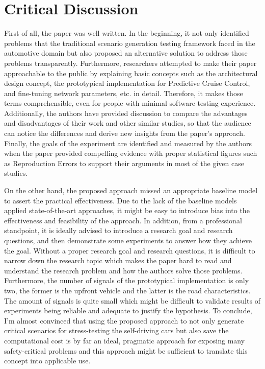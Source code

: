 \documentclass[10pt,a4paper]{report}
\begin{document}
\section{Critical Discussion}
First of all, the paper was well written. In the beginning, it not only identified problems that the traditional scenario generation testing framework faced in the automotive domain but also proposed an alternative solution to address those problems transparently.
%
Furthermore, researchers attempted to make their paper approachable to the public by explaining basic concepts such as the architectural design concept, the prototypical implementation for Predictive Cruise Control, and fine-tuning network parameters, etc. in detail. Therefore, it makes those terms comprehensible, even for people with minimal software testing experience.
%
Additionally, the authors have provided discussion to compare the advantages and disadvantages of their work and other similar studies, so that the audience can notice the differences and derive new insights from the paper's approach.
%
Finally, the goals of the experiment are identified and measured by the authors when the paper provided compelling evidence with proper statistical figures such as Reproduction Errors to support their arguments in most of the given case studies.
%

On the other hand, the proposed approach missed an appropriate baseline model to assert the practical effectiveness. 
%
Due to the lack of the baseline models applied state-of-the-art approaches, it might be easy to introduce bias into the effectiveness and feasibility of the approach.
%
In addition, from a professional standpoint, it is ideally advised to introduce a research goal and research questions, and then demonstrate some experiments to answer how they achieve the goal. 
%
Without a proper research goal and research questions, it is difficult to narrow down the research topic which makes the paper hard to read and understand the research problem and how the authors solve those problems.
%
Furthermore, the number of signals of the prototypical implementation is only two, the former is the upfront vehicle and the latter is the road characteristics.
%
The amount of signals is quite small which might be difficult to validate results of experiments being reliable and adequate to justify the hypothesis.
%
To conclude, I’m almost convinced that using the proposed approach to not only generate critical scenarios for stress-testing the self-driving cars but also save the computational cost is by far an ideal, pragmatic approach for exposing many safety-critical problems and this approach might be sufficient to translate this concept into applicable use.
\end{document}
